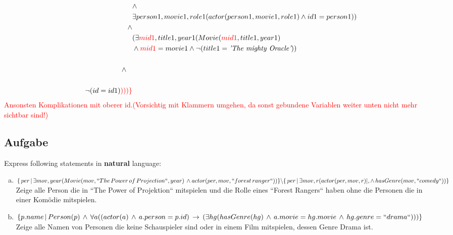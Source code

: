 \documentclass[11pt,a4paper,DIV=9]{scrartcl}
\newcounter{temp}
\newcommand{\aufgabe}[1]{
  \setcounter{temp}{\value{subsection}}
  \setcounter{subsection}{#1}
  \addtocounter{subsection}{-1}
  \subsection{Aufgabe}
  \setcounter{subsection}{\value{temp}}
}
\begin{document}
\begin{enumerate}[a)]
\begin{description}
\begin{align*}
                      &\wedge \\
                      & \exists person1,movie1,role1(actor(person1, movie1, role1) \wedge id1 = person1))\\
                      \wedge &\\
                      & (\exists \textcolor{red}{mid1}, title1, year1 (Movie(\textcolor{red}{mid1}, title1, year1)\\
                      & \wedge \textcolor{red}{mid1} = movie1 \wedge \neg(title1=\textit{'The mighty Oracle'}))\\
                      &\\
                      \wedge\,\,\,\,\, &\\
                      &\\
                      \neg(id = id1)\textcolor{red}{)))\}}
                      \end{align*}
                      \textcolor{red}{Ansonsten Komplikationen mit oberer id.(Vorsichtig mit Klammern umgehen, da sonst gebundene Variablen weiter unten nicht mehr sichtbar sind!)}
        \end{description}
    \end{enumerate}
\aufgabe{2}
Express following statements in \textbf{natural} language:
 \begin{enumerate}[a)]
   \item 
   $ 
   \{\, per \, | \, \exists mov, year (\\ 
   Movie(mov, ``The \, Power \, of \, Projection``, year) \,  \wedge \, \\actor(per,mov, ``forest \, ranger``)\\ 
   ) \} \backslash \{ \,per \, | \, \exists mov, r(actor(per, mov, r) |, \wedge \, hasGenre(mov, ``comedy``))\}
   $
  \\ Zeige alle Person die in ``The Power of Projektion`` mitspielen und die Rolle eines ``Forest Rangers`` haben ohne die Personen die in einer Kom\"odie mitspielen.
   \item 
   $
   \{p.name \, | \, Person(p) \, \wedge \, \forall a(\\  
   (actor(a) \, \wedge \, a.person=p.id) \, \rightarrow \, (\\
   \exists hg(hasGenre(hg) \, \wedge \, a.movie=hg.movie \, \wedge \, hg.genre=``drama``)
   \\)\\)\}
   $
   \\ Zeige alle Namen von Personen die keine Schauspieler sind oder in einem Film mitspielen, dessen Genre Drama ist.
 \end{enumerate}
\end{document}

